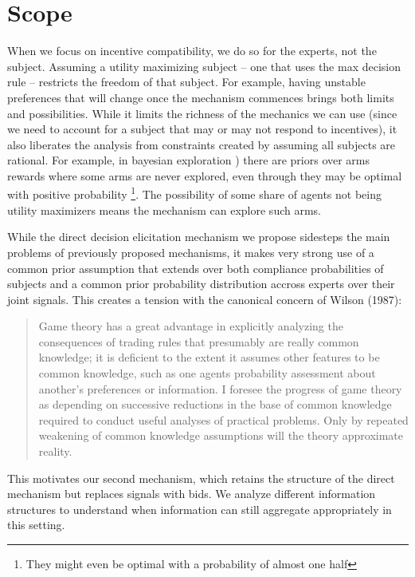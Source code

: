 \section{Scope}

When we focus on incentive compatibility, we do so for the experts, not the subject.
Assuming a utility maximizing subject -- one that uses the max decision rule -- restricts the freedom of that subject.
For example, having unstable preferences that will change once the mechanism commences brings both limits and possibilities.
While it limits the richness of the mechanics we can use (since we need to account for a subject that may or may not respond to incentives), it also liberates the analysis from constraints created by assuming all subjects are rational.
For example, in bayesian  exploration \citep{mansour2015bayesian}) there are priors over arms rewards where some arms are never explored, even through they may be optimal with positive probability \footnote{They might even be optimal with a probability of almost one half}. The possibility of some share of agents not being utility maximizers means the mechanism can explore such arms.

While the direct decision elicitation mechanism we propose sidesteps the main problems of previously proposed mechanisms, it makes very strong use of a common prior assumption that extends over both compliance probabilities of subjects and a common prior probability distribution accross experts over their joint signals. This creates a tension with the canonical concern of Wilson (1987):


\begin{quote}
Game theory has a great advantage in explicitly analyzing the consequences of trading rules that presumably are really common knowledge; it is deficient to the extent it assumes other features to be common knowledge, such as one agents probability assessment about another's preferences or information. I foresee the progress of game theory as depending on successive reductions in the base of common knowledge required to conduct useful analyses of practical problems. Only by repeated weakening of common knowledge assumptions will the theory approximate reality.
\end{quote}


This motivates our second mechanism, which retains the structure of the direct mechanism but replaces signals with bids. We analyze different information structures to understand when information can still aggregate appropriately in this setting.

